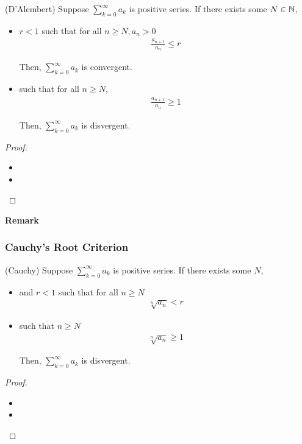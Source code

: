 \documentclass[Total.tex]{subfiles}
\begin{document}
					\begin{lemma}
						(D'Alembert) Suppose $\sum_{k=0}^\infty a_k$ is positive series. If there exists some $N\in \mathbb{N}$, 
						
						\begin{itemize}
							\item $r<1$ such that for all $n\geq N,a_n>0$
							\begin{gather*}
								\frac{a_{n+1}}{a_n}\leq r
							\end{gather*}
							
							Then, $\sum_{k=0}^\infty a_k$ is convergent.
							\item such that for all $n\geq N$,
							\begin{gather*}
								\frac{a_{n+1}}{a_n}\geq 1
							\end{gather*}
							
							Then, $\sum_{k=0}^\infty a_k$ is disvergent.
						\end{itemize}
					\end{lemma}
					\begin{proof}
						\begin{itemize}
							\item 
							\item 
						\end{itemize}
					\end{proof}
					
					\textbf{Remark}
				
				\subsubsection{Cauchy's Root Criterion}
				
					\begin{lemma}
						(Cauchy) Suppose $\sum_{k=0}^\infty a_k$ is positive series. If there exists some $N$,
						\begin{itemize}
							\item and $r<1$ such that for all $n\geq N$
							\begin{gather*}
								\sqrt[n]{a_n}<r
							\end{gather*}
							\item such that $n\geq N$
							\begin{gather*}
								\sqrt[n]{a_n}\geq 1
							\end{gather*}
							
							Then, $\sum_{k=0}^\infty a_k$ is disvergent. 
						\end{itemize}
					\end{lemma}
					\begin{proof}
						\begin{itemize}
							\item 
							\item 
						\end{itemize}
					\end{proof}
				
\end{document}
